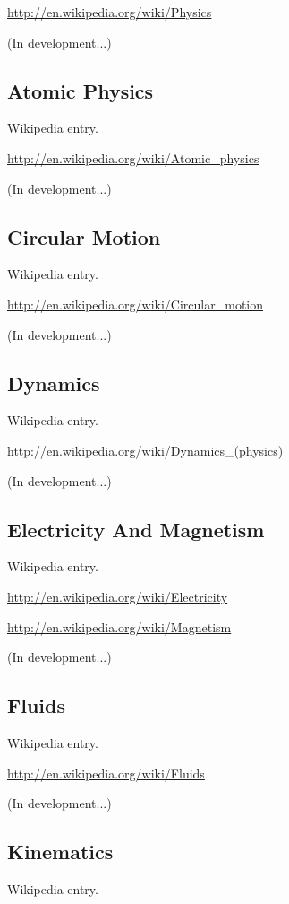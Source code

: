 \documentclass[12pt,twoside]{book}
\begin{document}
\href{http://en.wikipedia.org/wiki/Physics}{http://en.wikipedia.org/wiki/Physics}

(In development...)

\subsection[Atomic Physics]{Atomic Physics}
Wikipedia entry.

\href{http://en.wikipedia.org/wiki/Atomic_physics}{http://en.wikipedia.org/wiki/Atomic\_physics}

(In development...)

\subsection[Circular Motion]{Circular Motion}
Wikipedia entry.

\href{http://en.wikipedia.org/wiki/Circular_motion}{http://en.wikipedia.org/wiki/Circular\_motion}

(In development...)

\subsection[Dynamics]{Dynamics}
Wikipedia entry.

http://en.wikipedia.org/wiki/Dynamics\_(physics)

(In development...)

\subsection[Electricity And Magnetism]{Electricity
And Magnetism}
Wikipedia entry.

\href{http://en.wikipedia.org/wiki/Electricity}{http://en.wikipedia.org/wiki/Electricity}


\bigskip

\href{http://en.wikipedia.org/wiki/Magnetism}{http://en.wikipedia.org/wiki/Magnetism}

(In development...)

\subsection[Fluids]{Fluids}
Wikipedia entry.

\href{http://en.wikipedia.org/wiki/Fluids}{http://en.wikipedia.org/wiki/Fluids}

(In development...)

\subsection[Kinematics]{Kinematics}
Wikipedia entry.
\end{document}
